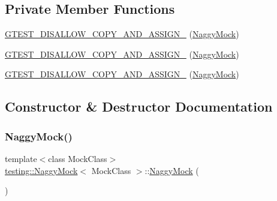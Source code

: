\subsection*{Private Member Functions}
\begin{DoxyCompactItemize}
\item 
\mbox{\hyperlink{classtesting_1_1_naggy_mock_af3b39b4a100fa43787c647fd9dbf30a8}{G\+T\+E\+S\+T\+\_\+\+D\+I\+S\+A\+L\+L\+O\+W\+\_\+\+C\+O\+P\+Y\+\_\+\+A\+N\+D\+\_\+\+A\+S\+S\+I\+G\+N\+\_\+}} (\mbox{\hyperlink{classtesting_1_1_naggy_mock}{Naggy\+Mock}})
\item 
\mbox{\hyperlink{classtesting_1_1_naggy_mock_af3b39b4a100fa43787c647fd9dbf30a8}{G\+T\+E\+S\+T\+\_\+\+D\+I\+S\+A\+L\+L\+O\+W\+\_\+\+C\+O\+P\+Y\+\_\+\+A\+N\+D\+\_\+\+A\+S\+S\+I\+G\+N\+\_\+}} (\mbox{\hyperlink{classtesting_1_1_naggy_mock}{Naggy\+Mock}})
\item 
\mbox{\hyperlink{classtesting_1_1_naggy_mock_af3b39b4a100fa43787c647fd9dbf30a8}{G\+T\+E\+S\+T\+\_\+\+D\+I\+S\+A\+L\+L\+O\+W\+\_\+\+C\+O\+P\+Y\+\_\+\+A\+N\+D\+\_\+\+A\+S\+S\+I\+G\+N\+\_\+}} (\mbox{\hyperlink{classtesting_1_1_naggy_mock}{Naggy\+Mock}})
\end{DoxyCompactItemize}


\subsection{Constructor \& Destructor Documentation}
\mbox{\label{classtesting_1_1_naggy_mock_acb769f78b93eb60b04db21250f416f70}} 
\subsubsection{\texorpdfstring{NaggyMock()}{NaggyMock()}\hspace{0.1cm}{\footnotesize\ttfamily [1/17]}}
{\footnotesize\ttfamily template$<$class Mock\+Class$>$ \\
\mbox{\hyperlink{classtesting_1_1_naggy_mock}{testing\+::\+Naggy\+Mock}}$<$ Mock\+Class $>$\+::\mbox{\hyperlink{classtesting_1_1_naggy_mock}{Naggy\+Mock}} (\begin{DoxyParamCaption}{ }\end{DoxyParamCaption})\hspace{0.3cm}{\ttfamily [inline]}}

